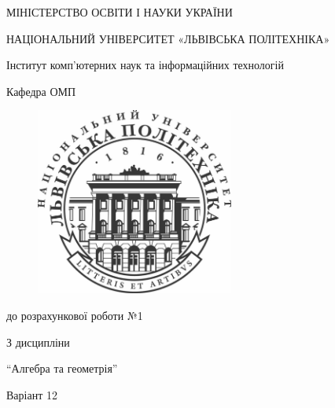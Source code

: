 \documentclass{article}
\begin{document}
\pagestyle{empty}
\begin{center}

	{\fontsize{14}{24}\selectfont МІНІСТЕРСТВО ОСВІТИ І НАУКИ УКРАЇНИ

	НАЦІОНАЛЬНИЙ УНІВЕРСИТЕТ «ЛЬВІВСЬКА ПОЛІТЕХНІКА»

	Інститут комп'ютерних наук та інформаційних технологій

	Кафедра ОМП

	}

	\vspace{90.4pt} %
	\begin{figure}[h]
		\centering
		\includegraphics[width=6.5cm,keepaspectratio]{../lpnu.png}
	\end{figure}

	{\fontsize{18}{29}\selectfont{Звіт}

	{до розрахункової роботи №1}

	{З дисципліни}

	{``Алгебра та геометрія''}

	{Варіант 12}

	}
\end{center}
\end{document}
